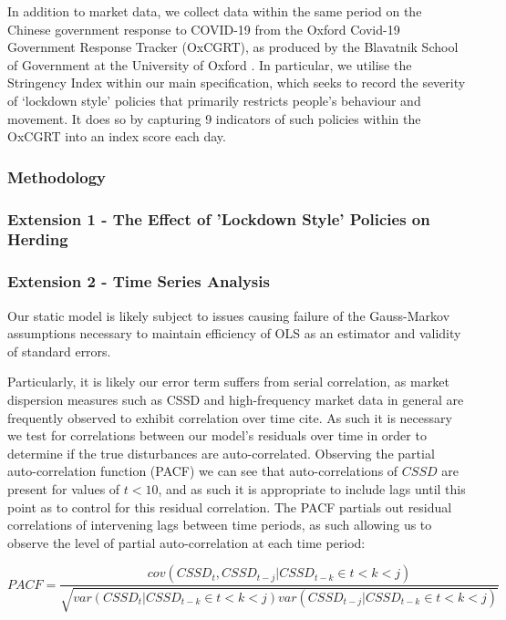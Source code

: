 \documentclass[12pt]{article}
\begin{document}
In addition to market data, we collect data within the same period on the Chinese government response to COVID-19 from the Oxford Covid-19 Government Response Tracker (OxCGRT), as produced by the Blavatnik School of Government at the University of Oxford \citep{OxCGRT}. In particular, we utilise the Stringency Index within our main specification, which seeks to record the severity of ‘lockdown style’ policies that primarily restricts people’s behaviour and movement. It does so by capturing 9 indicators of such policies within the OxCGRT into an index score each day.

\subsubsection*{Methodology}

\subsubsection*{Extension 1 - The Effect of 'Lockdown Style' Policies on Herding}

\subsubsection*{Extension 2 - Time Series Analysis}

Our static model is likely subject to issues causing failure of the Gauss-Markov assumptions necessary to maintain efficiency of OLS as an estimator and validity of standard errors. 

Particularly, it is likely our error term suffers from serial correlation, as market dispersion measures such as CSSD and high-frequency market data in general are frequently observed to exhibit correlation over time cite. As such it is necessary we test for correlations between our model’s residuals over time in order to determine if the true disturbances are auto-correlated. Observing the partial auto-correlation function (PACF) we can see that auto-correlations of $CSSD$ are present for values of $t<10$, and as such it is appropriate to include lags until this point as to control for this residual correlation. The PACF partials out residual correlations of intervening lags between time periods, as such allowing us to observe the level of partial auto-correlation at each time period:

$$
PACF=\frac{cov(CSSD_t,CSSD_{t-j}|CSSD_{t-k}\in{t<k<j})}{\sqrt{var(CSSD_t|CSSD_{t-k}\in{t<k<j})var(CSSD_{t-j}|CSSD_{t-k}\in{t<k<j})}}
$$
\end{document}
